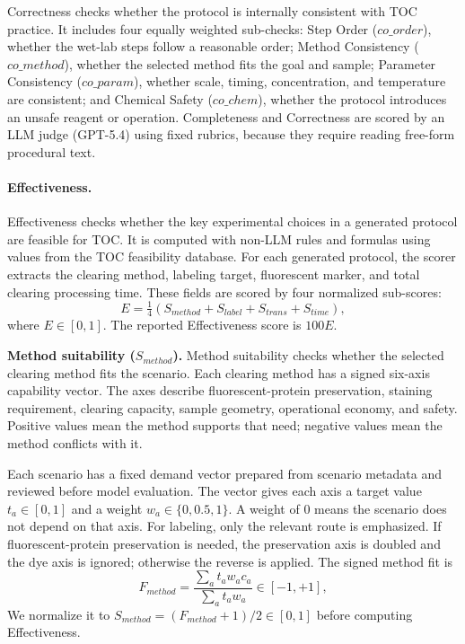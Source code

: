 \documentclass[conference]{IEEEtran}
\begin{document}
Correctness checks whether the protocol is internally consistent with TOC
practice. It includes four equally weighted sub-checks: Step Order
($co\_order$), whether the wet-lab steps follow a reasonable order; Method
Consistency ($co\_method$), whether the selected method fits the goal and
sample; Parameter Consistency ($co\_param$), whether scale, timing,
concentration, and temperature are consistent; and Chemical Safety
($co\_chem$), whether the protocol introduces an unsafe reagent or operation.
Completeness and Correctness are scored by an LLM judge (GPT-5.4) using fixed
rubrics, because they require reading free-form procedural text.

\paragraph{Effectiveness.}
Effectiveness checks whether the key experimental choices in a generated
protocol are feasible for TOC. It is computed with non-LLM rules and formulas
using values from the TOC feasibility database. For each generated protocol, the scorer extracts
the clearing method, labeling target, fluorescent marker, and total clearing processing time. These fields are scored
by four normalized sub-scores:
\begin{equation}
E =
\tfrac{1}{4}
\left(
S_{method} + S_{label} + S_{trans} + S_{time}
\right),
\end{equation}
where $E\in[0,1]$. The reported Effectiveness score is $100E$.

\noindent\textbf{Method suitability ($S_{method}$).}
Method suitability checks whether the selected clearing method fits the scenario.
Each clearing method has a signed six-axis capability vector. The axes describe
fluorescent-protein preservation, staining requirement, clearing capacity, sample
geometry, operational economy, and safety. Positive values mean the method
supports that need; negative values mean the method conflicts with it.

Each scenario has a fixed demand vector prepared from scenario metadata and
reviewed before model evaluation. The vector gives each axis a target value $t_a\in[0,1]$
and a weight $w_a\in\{0,0.5,1\}$. A weight of $0$ means the
scenario does not depend on that axis. 
For labeling, only the relevant route is emphasized. If fluorescent-protein
preservation is needed, the preservation axis is
doubled and the dye axis is ignored; otherwise the reverse is applied.
The signed method fit is
\begin{equation}
F_{method}
= \frac{\sum_a t_a w_a c_a}{\sum_a t_a w_a}
\in[-1,+1],
\end{equation}
We normalize it to
$S_{method}=(F_{method}+1)/2\in[0,1]$ before computing Effectiveness.
\end{document}
